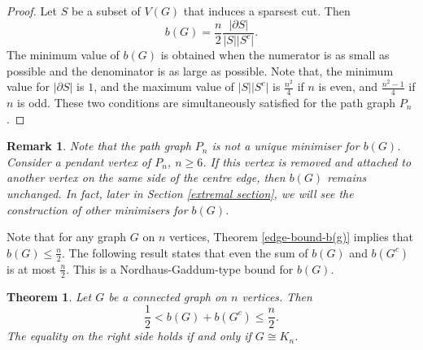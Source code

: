 \documentclass[12pt]{article}
\newtheorem{theorem}{Theorem}[section]
\newtheorem{remark}{Remark}[section]
\begin{document}
    \begin{proof}
    Let $S$ be a subset of $V(G)$ that induces a sparsest cut. Then $$b(G)=\frac{n}{2} \frac{\vert \partial S \vert}{\vert S \vert \vert S^c\vert}.$$ The minimum value of $b(G)$ is obtained when the numerator is as small as possible and the denominator is as large as possible. Note that, the minimum value for $\vert \partial S \vert$  is $1$,  and the maximum value of $\vert S \vert \vert S^c \vert $ is $\frac{n^2}{4}$ if $n$ is even, and $\frac{n^2-1}{4}$ if $n$ is odd.  These two conditions are simultaneously satisfied for the path graph $P_n$.
   \end{proof}


      \begin{remark}
        Note that the path graph $P_n$ is not a unique minimiser for $b(G)$.  Consider a pendant vertex of $P_n$, $n \geq 6$. If this vertex is removed and attached to another vertex on the same side of the centre edge, then $b(G)$ remains unchanged. In fact, later in Section \ref{extremal section}, we will see the construction of other minimisers for $b(G)$. 
        \end{remark}
     
    
Note that for any graph $G$ on $n$ vertices,  Theorem \ref{edge-bound-b(g)} implies that $b(G) \leq \frac{n}{2}$. The following result states that even the sum of $b(G)$ and $b(G^c)$ is at most $\frac{n}{2}$. This is a Nordhaus-Gaddum-type bound for $b(G)$.

\begin{theorem}\label{nord-gaddum}
    Let $G$ be a connected graph on $n$ vertices. Then $$\frac{1}{2} < b(G)+ b(G^c) \leq \frac{n}{2}.$$ The equality on the right side holds if and only if $G \cong K_{n}$.

\end{theorem}
\end{document}
